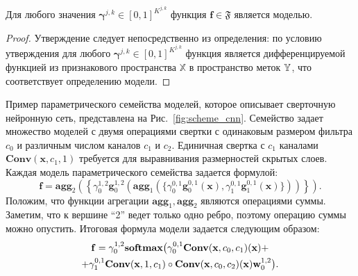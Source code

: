 \begin{utv}
Для любого значения $\boldsymbol{\gamma}^{j,k} \in [0,1]^{K^{j,k}}$ функция $\mathbf{f} \in \mathfrak{F}$ является моделью.
\end{utv}
\begin{proof}
Утверждение следует непосредственно из определения: по условию утверждения для любого $\boldsymbol{\gamma}^{j,k} \in [0,1]^{K^{j,k}}$ функция является дифференцируемой функцией из признакового пространства $\mathbb{X}$ в пространство меток $\mathbb{Y}$, что соответствует определению модели.
\end{proof}



Пример параметрического семейства моделей, которое описывает сверточную нейронную сеть, представлена на Рис.~\ref{fig:scheme_cnn}. Семейство задает множество моделей с двумя операциями свертки с одинаковым размером фильтра $c_0$ и различным числом каналов $c_1$ и $c_2$. Единичная свертка с $c_1$ каналами $\textbf{Conv}(\mathbf{x}, c_1, 1)$ требуется для выравнивания размерностей скрытых слоев. Каждая модель параметрического семейства задается формулой: 
\[
    \mathbf{f} = \textbf{agg}_2\left(\left\{{\gamma}^{1,2}_0 \mathbf{g}^{1,2}_0 \left(\textbf{agg}_1 \left(\{{\gamma}^{0,1}_0 \mathbf{g}^{0,1}_0(\mathbf{x}), {\gamma}^{0,1}_1 \mathbf{g}^{0,1}_1(\mathbf{x})  \} \right)\right)\right\}\right).
\]
Положим, что функции агрегации $ \textbf{agg}_1,  \textbf{agg}_2$ являются операциями суммы. Заметим, что к вершине ``2'' ведет только одно ребро, поэтому операцию суммы можно опустить. 
Итоговая формула модели задается следующим образом:
\begin{multline*}
    \mathbf{f} = {\gamma}^{1,2}_0 \textbf{softmax} \bigl({\gamma}^{0,1}_0 \textbf{Conv}(\mathbf{x}, c_0, c_1)(\mathbf{x}) +\\ + {\gamma}^{0,1}_1 \textbf{Conv}(\mathbf{x}, 1, c_1) \circ \textbf{Conv}(\mathbf{x}, c_0, c_2)(\mathbf{x}) \mathbf{w}^{1,2}_0\bigr).
\end{multline*}



